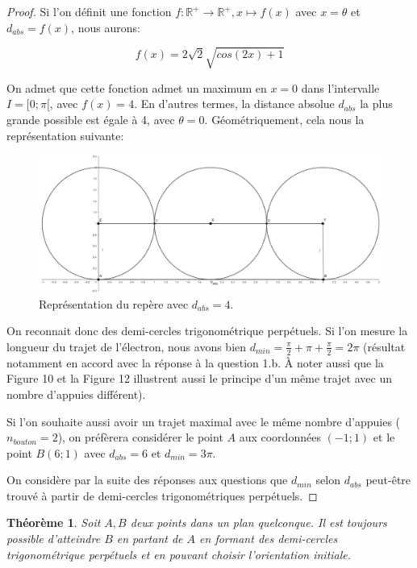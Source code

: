 \documentclass{amsart}
\newtheorem{theorem}{Théorème}[section]
\theoremstyle{definition}
\theoremstyle{remark}
\numberwithin{equation}{section}
\begin{document}
\begin{proof}
  Si l'on définit une fonction $f:\mathbb{R^+}\longrightarrow \mathbb{R^+}, x\longmapsto f(x)$ avec $x=\theta$ et $d_{abs}=f(x)$, nous aurons:

  \[f(x)=2\sqrt{2}\sqrt{cos(2x)+1}\]

  On admet que cette fonction admet un maximum en $x=0$ dans l'intervalle $I=[0;\pi[$, avec $f(x)=4$. En d'autres termes, la distance absolue $d_{abs}$ la plus grande possible est égale à 4, avec $\theta=0$. Géométriquement, cela nous la représentation suivante:

  \begin{figure}[H]
    \centering
    \includegraphics[scale=0.18]{perfect_run.png}
    \caption{Représentation du repère avec $d_{abs}=4$.}
  \end{figure}

  On reconnait donc des demi-cercles trigonométrique perpétuels. Si l'on mesure la longueur du trajet de l'électron, nous avons bien $d_{min}=\frac{\pi}{2}+\pi+\frac{\pi}{2}=2\pi$ (résultat notamment en accord avec la réponse à la question 1.b. À noter aussi que la Figure 10 et la Figure 12 illustrent aussi le principe d'un même trajet avec un nombre d'appuies différent). 

  Si l'on souhaite aussi avoir un trajet maximal avec le même nombre d'appuies ($n_{bouton}=2$), on préfèrera considérer le point $A$ aux coordonnées $(-1;1)$ et le point $B(6;1)$ avec $d_{abs}=6$ et $d_{min}=3\pi$.

  On considère par la suite des réponses aux questions que $d_{min}$ selon $d_{abs}$ peut-être trouvé à partir de demi-cercles trigonométriques perpétuels.

\end{proof}

\begin{theorem}
  Soit $A,B$ deux points dans un plan quelconque. Il est toujours possible d'atteindre $B$ en partant de $A$ en formant des demi-cercles trigonométrique perpétuels et en pouvant choisir l'orientation initiale.
\end{theorem}
\end{document}
